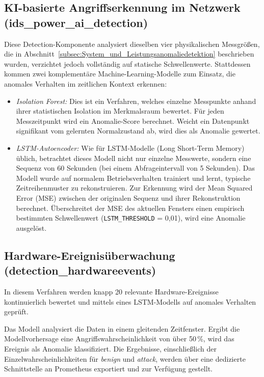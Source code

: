     \subsection{KI-basierte Angriffserkennung im Netzwerk (ids\_power\_ai\_detection)}
    Diese Detection-Komponente analysiert dieselben vier physikalischen Messgrößen, die in Abschnitt~\ref{subsec:System_und_Leistungsanomaliedetektion} beschrieben wurden, verzichtet jedoch vollständig auf statische Schwellenwerte. Stattdessen kommen zwei komplementäre Machine-Learning-Modelle zum Einsatz, die anomales Verhalten im zeitlichen Kontext erkennen:

    \begin{itemize}
        \item \textit{Isolation Forest:} Dies ist ein Verfahren, welches einzelne Messpunkte anhand ihrer statistischen Isolation im Merkmalsraum bewertet. Für jeden Messzeitpunkt wird ein Anomalie-Score berechnet. Weicht ein Datenpunkt signifikant vom gelernten Normalzustand ab, wird dies als Anomalie gewertet.
        \item \textit{LSTM-Autoencoder:} Wie für LSTM-Modelle (Long Short-Term Memory) üblich, betrachtet dieses Modell nicht nur einzelne Messwerte, sondern eine Sequenz von 60 Sekunden (bei einem Abfrageintervall von 5 Sekunden). Das Modell wurde auf normalem Betriebsverhalten trainiert und lernt, typische Zeitreihenmuster zu rekonstruieren. Zur Erkennung wird der Mean Squared Error (MSE) zwischen der originalen Sequenz und ihrer Rekonstruktion berechnet. Überschreitet der MSE des aktuellen Fensters einen empirisch bestimmten Schwellenwert (\texttt{LSTM\_THRESHOLD} = 0,01), wird eine Anomalie ausgelöst.
    \end{itemize}

    \subsection{Hardware-Ereignisüberwachung (detection\_hardwareevents)}
    In diesem Verfahren werden knapp 20 relevante Hardware-Ereignisse kontinuierlich bewertet und mittels eines LSTM-Modells auf anomales Verhalten geprüft. 

    Das Modell analysiert die Daten in einem gleitenden Zeitfenster. Ergibt die Modellvorhersage eine Angriffswahrscheinlichkeit von über 50\,\%, wird das Ereignis als Anomalie klassifiziert. Die Ergebnisse, einschließlich der Einzelwahrscheinlichkeiten für \textit{benign} und \textit{attack}, werden über eine dedizierte Schnittstelle an Prometheus exportiert und zur Verfügung gestellt.
